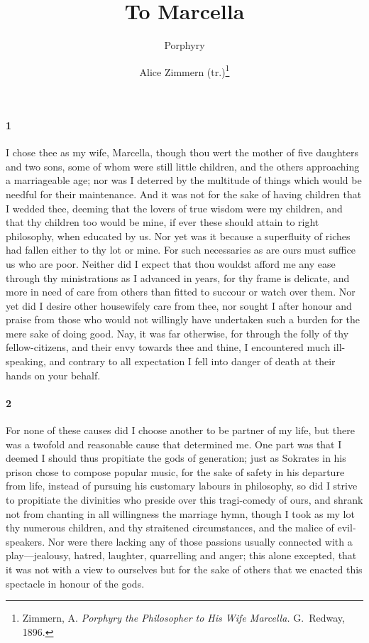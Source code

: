 \documentclass[12pt]{article}
\title{To Marcella}
\author{Porphyry \and Alice Zimmern (tr.)\footnote{Zimmern, A. \textit{Porphyry
the Philosopher to His Wife Marcella.} G.~Redway, 1896.}}
\date{}
\begin{document}
\maketitle

\paragraph{1} I chose thee as my wife, Marcella, though thou wert the mother of
five daughters and two sons, some of whom were still little children, and the
others approaching a marriageable age; nor was I deterred by the multitude of
things which would be needful for their maintenance. And it was not for the
sake of having children that I wedded thee, deeming that the lovers of true
wisdom were my children, and that thy children too would be mine, if ever these
should attain to right philosophy, when educated by us. Nor yet was it because
a superfluity of riches had fallen either to thy lot or mine. For such
necessaries as are ours must suffice us who are poor. Neither did I expect that
thou wouldst afford me any ease through thy ministrations as I advanced in
years, for thy frame is delicate, and more in need of care from others than
fitted to succour or watch over them. Nor yet did I desire other housewifely
care from thee, nor sought I after honour and praise from those who would not
willingly have undertaken such a burden for the mere sake of doing good. Nay,
it was far otherwise, for through the folly of thy fellow-citizens, and their
envy towards thee and thine, I encountered much ill-speaking, and contrary to
all expectation I fell into danger of death at their hands on your behalf.

\paragraph{2} For none of these causes did I choose another to be partner of my
life, but there was a twofold and reasonable cause that determined me. One part
was that I deemed I should thus propitiate the gods of generation; just as
Sokrates in his prison chose to compose popular music, for the sake of safety
in his departure from life, instead of pursuing his customary labours in
philosophy, so did I strive to propitiate the divinities who preside over this
tragi-comedy of ours, and shrank not from chanting in all willingness the
marriage hymn, though I took as my lot thy numerous children, and thy
straitened circumstances, and the malice of evil-speakers. Nor were there
lacking any of those passions usually connected with a play---jealousy, hatred,
laughter, quarrelling and anger; this alone excepted, that it was not with a
view to ourselves but for the sake of others that we enacted this spectacle in
honour of the gods.
\end{document}
